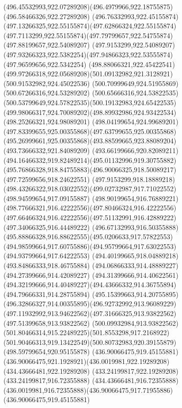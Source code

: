 {{		\curveto(496.45532993,922.07289208)(496.4979966,922.18755875)(496.58466326,922.27289208)
		\curveto(496.76332993,922.45155874)(497.13266325,922.55155874)(497.62866324,922.55155874)
		\curveto(497.7113299,922.55155874)(497.79799657,922.54755874)(497.88199657,922.54089207)
		\lineto(497.9153299,922.54089207)
		\curveto(497.93266323,922.5382254)(497.94866323,922.53555874)(497.96599656,922.5342254)
		\curveto(498.88066321,922.45422541)(499.97266318,922.05689208)(501.09132982,921.3128921)
		\lineto(500.91532982,924.45022536)
		\lineto(500.70999649,924.51955869)
		\lineto(500.67266316,924.53289202)
		\curveto(500.65666316,924.53822535)(500.53799649,924.57822535)(500.19132983,924.65422535)
		\curveto(499.98066317,924.70089202)(498.89932986,924.93422534)(498.25266321,924.98089201)
		\curveto(498.04199654,924.99689201)(497.83399655,925.00355868)(497.63799655,925.00355868)
		\curveto(495.26999661,925.00355868)(493.88599665,923.88089204)(493.73666332,921.84089209)
		\curveto(493.66199666,920.82089211)(494.16466332,919.82489214)(495.01132996,919.30755882)
		\curveto(495.76866328,918.84755883)(496.90066325,918.50089217)(497.72599656,918.24622551)
		\lineto(497.9153299,918.18889218)
		\curveto(498.43266322,918.03022552)(499.02732987,917.71022552)(498.94599654,917.09155887)
		\curveto(498.90199654,916.76889221)(498.77666321,916.42222556)(497.80466324,916.42222556)
		\curveto(497.66466324,916.42222556)(497.51132991,916.42889222)(497.34066325,916.44489222)
		\curveto(496.67132993,916.50355888)(495.88866328,916.88622555)(495.0206633,917.57822553)
		\curveto(494.98599664,917.60755886)(494.95799664,917.63022553)(494.93799664,917.64222553)
		\lineto(494.40199665,918.04889218)
		\lineto(493.84866333,918.46755884)
		\lineto(494.06866333,914.48889227)
		\lineto(494.27399666,914.42089227)
		\lineto(494.31399666,914.40622561)
		\curveto(494.32199666,914.40489227)(494.43666332,914.36755894)(494.79666331,914.28755894)
		\curveto(495.15399663,914.20755895)(496.32866327,914.00355895)(496.92732992,913.96089229)
		\curveto(497.11932992,913.94622562)(497.31666325,913.93822562)(497.51399658,913.93822562)
		\curveto(500.09932984,913.93822562)(501.80466314,915.22489225)(501.8553298,917.2168922)
		\curveto(501.90466313,919.13422549)(500.80732983,920.39155879)(498.59799654,920.95155878)
		\moveto(436.90066475,919.45155881)
		\curveto(436.90066475,921.1928921)(436.0019981,922.19289208)(434.43666481,922.19289208)
		\lineto(433.24199817,922.19289208)
		\lineto(433.24199817,916.72355888)
		\lineto(434.43666481,916.72355888)
		\curveto(436.0019981,916.72355888)(436.90066475,917.71955886)(436.90066475,919.45155881)
}}
